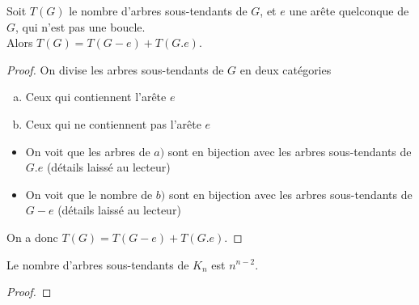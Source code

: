 \begin{myform} 
  Soit $T(G)$ le nombre d'arbres sous-tendants de $G$, et $e$ une arête quelconque de $G$, qui n'est pas une boucle. \\
  Alors $T(G) = T(G − e) + T (G.e)$.
  \begin{proof}
  On divise les arbres sous-tendants de $G$ en deux catégories
  \begin{enumerate}[a)]
    \item Ceux qui contiennent l'arête $e$
    \item Ceux qui ne contiennent pas l'arête $e$
  \end{enumerate}
  \begin{itemize}
    \item On voit que les arbres de $a)$ sont en bijection avec les arbres sous-tendants de $G.e$ (détails laissé au lecteur)
    \item On voit que le nombre de $b)$ sont en bijection avec les arbres sous-tendants de $G-e$ (détails laissé au lecteur)
  \end{itemize}
  On a donc $T(G) = T(G − e) + T (G.e)$.
  \end{proof}
\end{myform}

\begin{mytheo} 
  Le nombre d'arbres sous-tendants de $K_n$ est $n^{n−2}$.
  \begin{proof}
    \addTODO
  \end{proof}
\end{mytheo}

